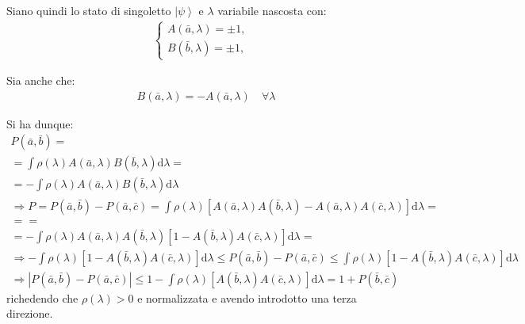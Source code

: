 Siano quindi lo stato di singoletto $\left |\psi  \right\rangle$ e $\lambda$ variabile nascosta con:
\begin{equation}\begin{split}
\begin{cases}
A\left(\bar a,\lambda\right)=\pm 1, & \textrm{}\\
B\left(\bar b,\lambda\right)=\pm 1, & \textrm{}
\end{cases}
\end{split}\end{equation}

Sia anche che:
\begin{equation}\begin{split}
B\left(\bar a,\lambda\right)=-A\left(\bar a,\lambda\right) \quad \forall \lambda
\end{split}\end{equation}

Si ha dunque:
\begin{equation}\begin{split}
P\left(\bar a,\bar b\right)=\\
=\int{\rho\left(\lambda\right)A\left(\bar a,\lambda\right)B\left(\bar b,\lambda\right)\textrm{d}\lambda}=\\
=-\int{\rho\left(\lambda\right)A\left(\bar a,\lambda\right)B\left(\bar b,\lambda\right)\textrm{d}\lambda}\\
\Longrightarrow P=P\left(\bar a,\bar b\right)-P\left(\bar a,\bar c\right)=\int{\rho\left(\lambda\right)\left[A\left(\bar a,\lambda\right)A\left(\bar b,\lambda\right)-A\left(\bar a,\lambda\right)A\left(\bar c,\lambda\right)\right]\textrm{d}\lambda}=\\
==\\
=-\int{\rho\left(\lambda\right)A\left(\bar a,\lambda\right)A\left(\bar b,\lambda\right)\left[1-A\left(\bar b,\lambda\right)A\left(\bar c,\lambda\right)\right]\textrm{d}\lambda}=\\
\Longrightarrow -\int{\rho\left(\lambda\right)\left[1-A\left(\bar b,\lambda\right)A\left(\bar c,\lambda\right)\right]\textrm{d}\lambda}\le P\left(\bar a,\bar b\right)-P\left(\bar a,\bar c\right)\le \int{\rho\left(\lambda\right)\left[1-A\left(\bar b,\lambda\right)A\left(\bar c,\lambda\right)\right]\textrm{d}\lambda}\\
\Longrightarrow \left|P\left(\bar a,\bar b\right)-P\left(\bar a,\bar c\right)\right|\le 1-\int{\rho\left(\lambda\right)\left[A\left(\bar b,\lambda\right)A\left(\bar c,\lambda\right)\right]\textrm{d}\lambda}=1+P\left(\bar b,\bar c\right)
\end{split}\end{equation}
richedendo che $\rho\left(\lambda\right)>0$ e normalizzata e avendo introdotto una terza direzione.

